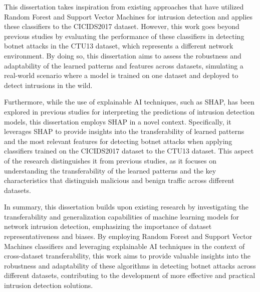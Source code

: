 This dissertation takes inspiration from existing approaches that have utilized Random Forest and Support Vector Machines for intrusion detection and applies these classifiers to the CICIDS2017 dataset. However, this work goes beyond previous studies by evaluating the performance of these classifiers in detecting botnet attacks in the CTU13 dataset, which represents a different network environment. By doing so, this dissertation aims to assess the robustness and adaptability of the learned patterns and features across datasets, simulating a real-world scenario where a model is trained on one dataset and deployed to detect intrusions in the wild.

Furthermore, while the use of explainable AI techniques, such as SHAP, has been explored in previous studies for interpreting the predictions of intrusion detection models, this dissertation employs SHAP in a novel context. Specifically, it leverages SHAP to provide insights into the transferability of learned patterns and the most relevant features for detecting botnet attacks when applying classifiers trained on the CICIDS2017 dataset to the CTU13 dataset. This aspect of the research distinguishes it from previous studies, as it focuses on understanding the transferability of the learned patterns and the key characteristics that distinguish malicious and benign traffic across different datasets.

In summary, this dissertation builds upon existing research by investigating the transferability and generalization capabilities of machine learning models for network intrusion detection, emphasizing the importance of dataset representativeness and biases. By employing Random Forest and Support Vector Machines classifiers and leveraging explainable AI techniques in the context of cross-dataset transferability, this work aims to provide valuable insights into the robustness and adaptability of these algorithms in detecting botnet attacks across different datasets, contributing to the development of more effective and practical intrusion detection solutions.